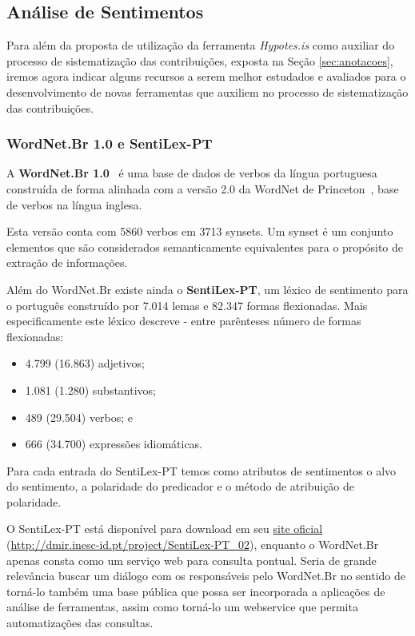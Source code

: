 \subsection{Análise de Sentimentos\label{subsec:analise-sentimentos}}
Para além da proposta de utilização da ferramenta \textit{Hypotes.is} como auxiliar do processo de sistematização das contribuições, exposta na Seção \ref{sec:anotacoes}, iremos agora indicar alguns recursos a serem melhor estudados e avaliados para o desenvolvimento de novas ferramentas que auxiliem no processo de sistematização das contribuições.

\subsubsection{WordNet.Br 1.0 e SentiLex-PT}
A \textbf{WordNet.Br 1.0}~\cite{wordnetbr} é uma base de dados de verbos da língua portuguesa construída de forma alinhada com a versão 2.0 da WordNet de Princeton~\cite{wordnetpr,Miller:1995:WLD:219717.219748}, base de verbos na língua inglesa.

Esta versão conta com 5860 verbos em 3713 \glspl{synset}. Um \gls{synset} é um conjunto elementos que são considerados semanticamente equivalentes para o propósito de extração de informações.

Além do WordNet.Br existe ainda o \textbf{SentiLex-PT}\cite{sentilexpt,carvalho2015sentilex}, um léxico de sentimento para o português construído por 7.014 lemas e 82.347 formas flexionadas. Mais especificamente este léxico descreve - entre parênteses número de formas flexionadas:
\begin{itemize}
\item 4.799 (16.863) adjetivos;
\item 1.081 (1.280) substantivos;
\item 489 (29.504) verbos; e
\item 666 (34.700) expressões idiomáticas.
\end{itemize}

Para cada entrada do SentiLex-PT temos como atributos de sentimentos o alvo do sentimento, a polaridade do predicador e o método de atribuição de polaridade.

O SentiLex-PT está disponível para download em seu \href{http://dmir.inesc-id.pt/project/SentiLex-PT_02}{site oficial} (\url{http://dmir.inesc-id.pt/project/SentiLex-PT_02}), enquanto o WordNet.Br apenas consta como um serviço web para consulta pontual. Seria de grande relevância buscar um diálogo com os responsáveis pelo WordNet.Br no sentido de torná-lo também uma base pública que possa ser incorporada a aplicações de análise de ferramentas, assim como torná-lo um webservice que permita automatizações das consultas.

